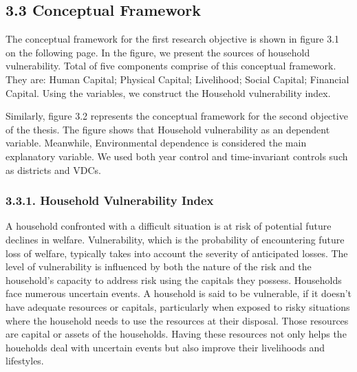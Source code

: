\documentclass[12pt, a4paper]{article}
\begin{document}
\subsection*{3.3 Conceptual Framework}
\renewcommand{\thepage}{\arabic{page}}
The conceptual framework for the first research objective is shown in figure 3.1 on the following page. In the figure, we present the sources of household vulnerability. Total of five components comprise of this conceptual framework. They are: Human Capital; Physical Capital; Livelihood; Social Capital; Financial Capital. Using the variables, we construct the Household vulnerability index. 

Similarly, figure 3.2 represents the conceptual framework for the second objective of the thesis. The figure shows that Household vulnerability as an dependent variable. Meanwhile, Environmental dependence is considered the main explanatory variable. We used both year control and time-invariant controls such as districts and VDCs. 

\subsubsection{3.3.1. Household Vulnerability Index}
\renewcommand{\thepage}{\arabic{page}}
A household confronted with a difficult situation is at risk of potential future declines in welfare. Vulnerability, which is the probability of encountering future loss of welfare, typically takes into account the severity of anticipated losses. The level of vulnerability is influenced by both the nature of the risk and the household's capacity to address risk using the capitals they possess. Households face numerous uncertain events. A household is said to be vulnerable, if it doesn't have adequate resources or capitals, particularly when exposed to risky situations where the household needs to use the resources at their disposal. Those resources are capital or assets of the households. Having these resources not only helps the houeholds deal with uncertain events but also improve their livelihoods and lifestyles. 
\end{document}
